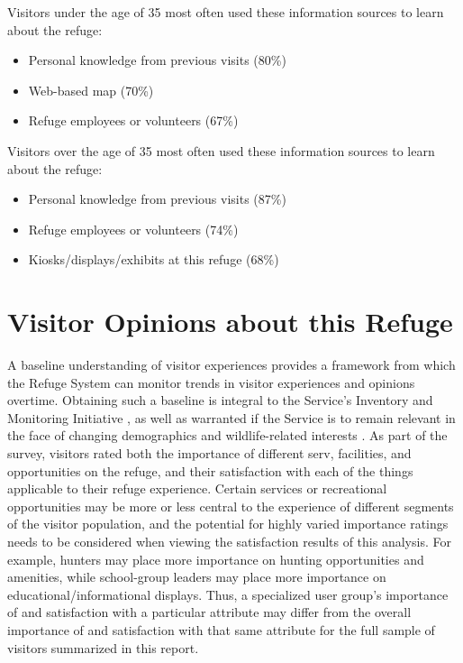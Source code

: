 \documentclass[]{book}
\providecommand{\tightlist}{%
  \setlength{\itemsep}{0pt}\setlength{\parskip}{0pt}}
\let\BeginKnitrBlock\begin \let\EndKnitrBlock\end
\begin{document}
Visitors under the age of 35 most often used these information sources
to learn about the refuge:

\begin{itemize}
\tightlist
\item
  Personal knowledge from previous visits (80\%)
\item
  Web-based map (70\%)
\item
  Refuge employees or volunteers (67\%)
\end{itemize}

Visitors over the age of 35 most often used these information sources to
learn about the refuge:

\begin{itemize}
\tightlist
\item
  Personal knowledge from previous visits (87\%)
\item
  Refuge employees or volunteers (74\%)
\item
  Kiosks/displays/exhibits at this refuge (68\%)
\end{itemize}

\chapter{Visitor Opinions about this Refuge}\label{opin}

\BeginKnitrBlock{heading4}
A baseline understanding of visitor experiences provides a framework
from which the Refuge System can monitor trends in visitor experiences
and opinions overtime. Obtaining such a baseline is integral to the
Service's Inventory and Monitoring Initiative \citep{USFWS2017}, as well
as warranted if the Service is to remain relevant in the face of
changing demographics and wildlife-related interests \citep{USFWS2014}.
As part of the survey, visitors rated both the importance of different
serv, facilities, and opportunities on the refuge, and their
satisfaction with each of the things applicable to their refuge
experience. Certain services or recreational opportunities may be more
or less central to the experience of different segments of the visitor
population, and the potential for highly varied importance ratings needs
to be considered when viewing the satisfaction results of this analysis.
For example, hunters may place more importance on hunting opportunities
and amenities, while school-group leaders may place more importance on
educational/informational displays. Thus, a specialized user group's
importance of and satisfaction with a particular attribute may differ
from the overall importance of and satisfaction with that same attribute
for the full sample of visitors summarized in this report.
\EndKnitrBlock{heading4}
\end{document}
